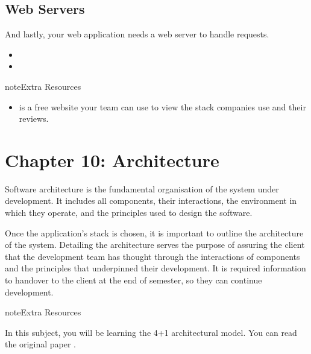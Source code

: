 \documentclass[letterpaper,10pt,english]{jupyterBook}
\begin{document}
\section{Web Servers}
\label{\detokenize{chapter_9/technology_stack:web-servers}}
\sphinxAtStartPar
And lastly, your web application needs a web server to handle requests.
\begin{itemize}
\item {} 
\sphinxAtStartPar
{}

\item {} 
\sphinxAtStartPar
{}

\end{itemize}

\begin{sphinxadmonition}{note}{Extra Resources}
\begin{itemize}
\item {} 
\sphinxAtStartPar
{} is a free website your
team can use to view the stack companies use and their reviews.

\end{itemize}
\end{sphinxadmonition}


\chapter{Chapter 10: Architecture}
\label{\detokenize{chapter_10/architecture:chapter-10-architecture}}\label{\detokenize{chapter_10/architecture::doc}}
\sphinxAtStartPar
Software architecture is the fundamental organisation of the system
under development. It includes all components, their interactions, the
environment in which they operate, and the principles used to design the
software.

\sphinxAtStartPar
Once the application’s stack is chosen, it is important to outline the
architecture of the system. Detailing the architecture serves the
purpose of assuring the client that the development team has thought
through the interactions of components and the principles that
underpinned their development. It is required information to handover to
the client at the end of semester, so they can continue development.

\begin{sphinxadmonition}{note}{Extra Resources}

\sphinxAtStartPar
In this subject, you will be learning the 4+1 architectural model. You can read the original paper
.
\end{sphinxadmonition}
\end{document}
